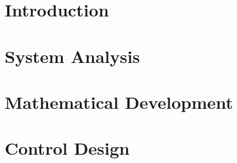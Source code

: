 \documentclass{report}
\begin{document}


\tableofcontents

\listoffigures

\chapter*{Introduction}


\chapter{System Analysis}


\chapter{Mathematical Development}


\chapter{Control Design}


\linespread{1.2}
\setlength{\parskip}{1em}

\printbibliography%
\nocite{*}
\end{document}
